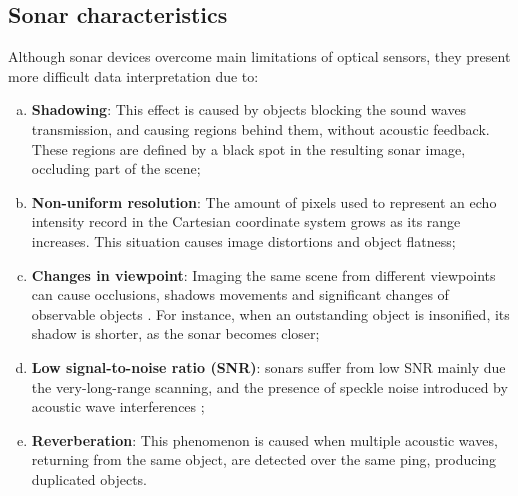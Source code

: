\documentclass[final,5p,times]{elsarticle}
\begin{document}

\subsection{Sonar characteristics}
\label{sonar:characteristics}

Although sonar devices overcome main limitations of optical sensors, they
present more difficult data interpretation due to:

\begin{enumerate}[a)]
    \item \textbf{Shadowing}: This effect is caused by objects blocking the
sound waves transmission, and causing regions behind them, without acoustic feedback. These regions are defined by a black spot in the resulting sonar image, occluding part of the scene;
    \item \textbf{Non-uniform resolution}: The amount of pixels used to represent an echo intensity record in the Cartesian coordinate system grows as its range increases. This situation causes image distortions and object flatness;
    \item \textbf{Changes in viewpoint}: Imaging the same scene from different viewpoints can cause occlusions, shadows movements and significant  changes of observable objects \cite{hurtos2014}. For instance, when an    outstanding object is insonified, its shadow is shorter, as the sonar becomes closer;
    \item \textbf{Low signal-to-noise ratio (SNR)}: sonars suffer from low SNR mainly due the very-long-range scanning, and the presence of speckle noise introduced by acoustic wave interferences \cite{abbott1979};
    \item \textbf{Reverberation}: This phenomenon is caused when multiple acoustic waves, returning from the same object, are detected over the same ping, producing duplicated objects.
\end{enumerate}
\end{document}
